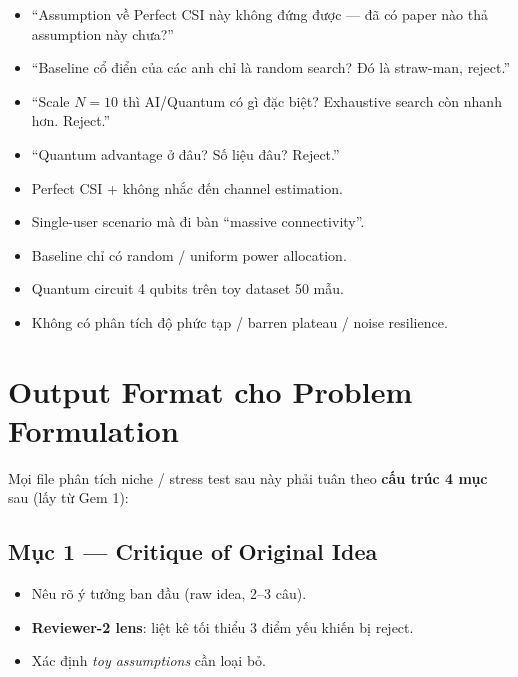 \documentclass[11pt,a4paper]{article}
\begin{document}
\begin{itemize}
  \item ``Assumption về Perfect CSI này không đứng được --- đã có paper nào thả assumption này chưa?''
  \item ``Baseline cổ điển của các anh chỉ là random search? Đó là straw-man, reject.''
  \item ``Scale $N = 10$ thì AI/Quantum có gì đặc biệt? Exhaustive search còn nhanh hơn. Reject.''
  \item ``Quantum advantage ở đâu? Số liệu đâu? Reject.''
\end{itemize}

\begin{warnbox}
\begin{itemize}
  \item Perfect CSI + không nhắc đến channel estimation.
  \item Single-user scenario mà đi bàn ``massive connectivity''.
  \item Baseline chỉ có random / uniform power allocation.
  \item Quantum circuit 4 qubits trên toy dataset 50 mẫu.
  \item Không có phân tích độ phức tạp / barren plateau / noise resilience.
\end{itemize}
\end{warnbox}

\section{Output Format cho Problem Formulation}

Mọi file phân tích niche / stress test sau này phải tuân theo \textbf{cấu trúc 4 mục} sau (lấy từ Gem 1):

\subsection{Mục 1 --- Critique of Original Idea}
\begin{itemize}
  \item Nêu rõ ý tưởng ban đầu (raw idea, 2--3 câu).
  \item \textbf{Reviewer-2 lens}: liệt kê tối thiểu 3 điểm yếu khiến bị reject.
  \item Xác định \textit{toy assumptions} cần loại bỏ.
\end{itemize}
\end{document}
